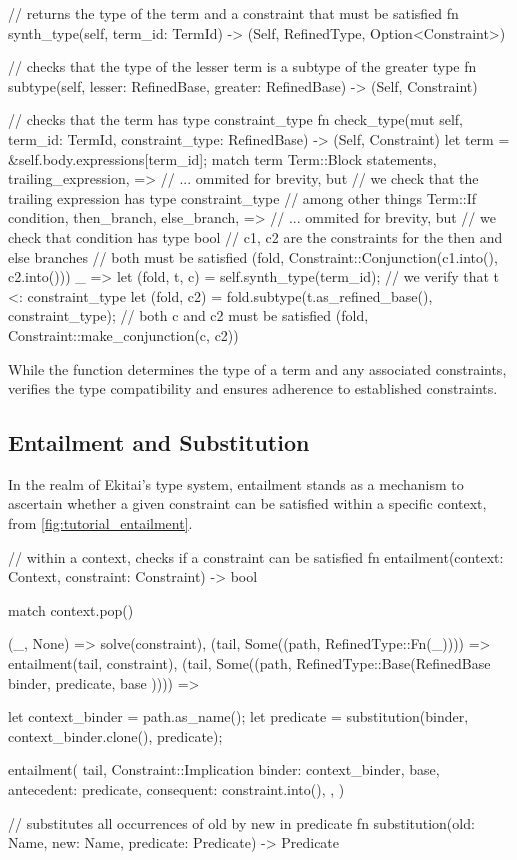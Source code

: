 \documentclass[
  oneside,
  english,
  coorientadorbanca,
  noabntexcite
]{ufsc-thesis-rn46-2019}
\newcommand{\codett}[1]{\text{\scpfamily#1}}
\begin{document}
\begin{rustcode}
// returns the type of the term and a constraint that must be satisfied
fn synth_type(self, term_id: TermId) -> (Self, RefinedType, Option<Constraint>)

// checks that the type of the lesser term is a subtype of the greater type
fn subtype(self, lesser: RefinedBase, greater: RefinedBase) -> (Self, Constraint)

// checks that the term has type constraint_type
fn check_type(mut self, term_id: TermId, constraint_type: RefinedBase) -> (Self, Constraint) {
  let term = &self.body.expressions[term_id];
  match term {
    Term::Block {
      statements,
      trailing_expression,
    } => {
      // ... ommited for brevity, but
      // we check that the trailing expression has type constraint_type
      // among other things
    }
    Term::If {
      condition,
      then_branch,
      else_branch,
    } => {
      // ... ommited for brevity, but
      // we check that condition has type bool
      // c1, c2 are the constraints for the then and else branches
      // both must be satisfied
      (fold, Constraint::Conjunction(c1.into(), c2.into()))
    }
    _ => {
      let (fold, t, c) = self.synth_type(term_id);
      // we verify that t <: constraint_type
      let (fold, c2) = fold.subtype(t.as_refined_base(), constraint_type);
      // both c and c2 must be satisfied
      (fold, Constraint::make_conjunction(c, c2))
    }
  }
}
\end{rustcode}

While the \codett{synth\_type} function determines the type of a term and any associated constraints, \codett{check\_type} verifies the type compatibility and ensures adherence to established constraints.

\subsection{Entailment and Substitution}

In the realm of Ekitai's type system, entailment stands as a mechanism to ascertain whether a given constraint can be satisfied within a specific context, from \autoref{fig:tutorial_entailment}.

\begin{rustcode}
// within a context, checks if a constraint can be satisfied
fn entailment(context: Context, constraint: Constraint) -> bool {
  match context.pop() {
    (_, None) => solve(constraint),
    (tail, Some((path, RefinedType::Fn(_)))) => entailment(tail, constraint),
    (tail, Some((path, RefinedType::Base(RefinedBase { binder, predicate, base })))) => {
      let context_binder = path.as_name();
      let predicate = substitution(binder, context_binder.clone(), predicate);

      entailment(
        tail,
        Constraint::Implication {
          binder: context_binder,
          base,
          antecedent: predicate,
          consequent: constraint.into(),
        },
      )
    }
  }
}

// substitutes all occurrences of old by new in predicate
fn substitution(old: Name, new: Name, predicate: Predicate) -> Predicate
\end{rustcode}
\end{document}
